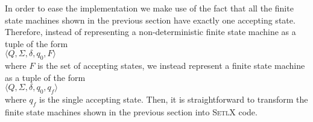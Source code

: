In order to ease the implementation we make use of the fact that all the finite
state machines shown in 
the previous section have exactly one accepting state.  Therefore, instead of representing a
non-deterministic finite state machine as a tuple of the form
\\[0.2cm]
\hspace*{1.3cm}
$\langle Q, \Sigma, \delta, q_0, F \rangle$
\\[0.2cm]
where $F$ is the set of accepting states, we instead represent a finite state machine as a tuple of
the form
\\[0.2cm]
\hspace*{1.3cm}
$\langle Q, \Sigma, \delta, q_0, q_f \rangle$
\\[0.2cm]
where $q_f$ is the single accepting state.  Then, it is straightforward to transform the finite
state machines shown in the previous section into \textsc{SetlX} code.

